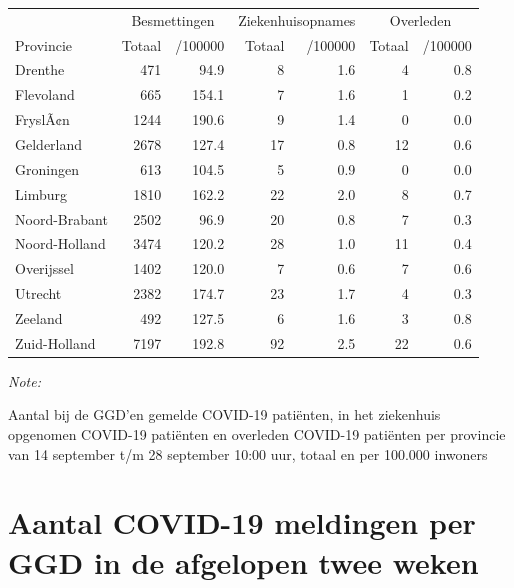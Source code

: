 \documentclass[
  english,
  man,floatsintext]{apa6}
\begin{document}
\begin{table}
\centering
\begin{threeparttable}
\begin{tabular}{lrrrrrr}
\toprule
\multicolumn{1}{c}{ } & \multicolumn{2}{c}{Besmettingen} & \multicolumn{2}{c}{Ziekenhuisopnames} & \multicolumn{2}{c}{Overleden} \\
\cmidrule(l{3pt}r{3pt}){2-3} \cmidrule(l{3pt}r{3pt}){4-5} \cmidrule(l{3pt}r{3pt}){6-7}
Provincie & Totaal & /100000 & Totaal & /100000 & Totaal & /100000\\
\midrule
Drenthe & 471 & 94.9 & 8 & 1.6 & 4 & 0.8\\
Flevoland & 665 & 154.1 & 7 & 1.6 & 1 & 0.2\\
FryslÃ¢n & 1244 & 190.6 & 9 & 1.4 & 0 & 0.0\\
Gelderland & 2678 & 127.4 & 17 & 0.8 & 12 & 0.6\\
Groningen & 613 & 104.5 & 5 & 0.9 & 0 & 0.0\\
Limburg & 1810 & 162.2 & 22 & 2.0 & 8 & 0.7\\
Noord-Brabant & 2502 & 96.9 & 20 & 0.8 & 7 & 0.3\\
Noord-Holland & 3474 & 120.2 & 28 & 1.0 & 11 & 0.4\\
Overijssel & 1402 & 120.0 & 7 & 0.6 & 7 & 0.6\\
Utrecht & 2382 & 174.7 & 23 & 1.7 & 4 & 0.3\\
Zeeland & 492 & 127.5 & 6 & 1.6 & 3 & 0.8\\
Zuid-Holland & 7197 & 192.8 & 92 & 2.5 & 22 & 0.6\\
\bottomrule
\end{tabular}
\begin{tablenotes}
\item \textit{Note: } 
\item Aantal bij de GGD’en gemelde COVID-19 patiënten, in het ziekenhuis opgenomen COVID-19 patiënten en overleden COVID-19 patiënten per provincie van 14 september t/m 28 september 10:00 uur, totaal en per 100.000 inwoners
\end{tablenotes}
\end{threeparttable}
\end{table}

\newpage

\hypertarget{aantal-covid-19-meldingen-per-ggd-in-de-afgelopen-twee-weken}{%
\section{Aantal COVID-19 meldingen per GGD in de afgelopen twee weken}\label{aantal-covid-19-meldingen-per-ggd-in-de-afgelopen-twee-weken}}
\end{document}
